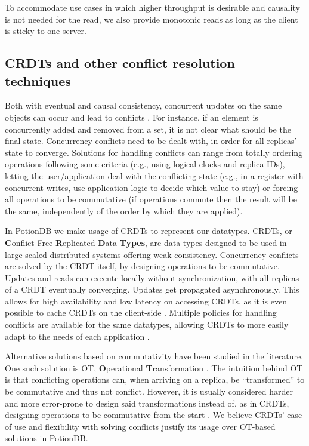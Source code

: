 To accommodate use cases in which higher throughput is desirable and causality is not needed for the read, we also provide monotonic reads as long as the client is sticky to one server.

\subsection{CRDTs and other conflict resolution techniques}

Both with eventual and causal consistency, concurrent updates on the same objects can occur and lead to conflicts \cite{understandingEC}.
For instance, if an element is concurrently added and removed from a set, it is not clear what should be the final state.
Concurrency conflicts need to be dealt with, in order for all replicas' state to converge.
Solutions for handling conflicts can range from totally ordering operations following some criteria (e.g., using logical clocks and replica IDs), letting the user/application deal with the conflicting state (e.g., in a register with concurrent writes, use application logic to decide which value to stay) or forcing all operations to be commutative (if operations commute then the result will be the same, independently of the order by which they are applied).

In PotionDB we make usage of CRDTs \cite{crdt} to represent our datatypes.
CRDTs, or \textbf{C}onflict-Free  \textbf{R}eplicated \textbf{D}ata \textbf{Types}, are data types designed to be used in large-scaled distributed systems offering weak consistency.
Concurrency conflicts are solved by the CRDT itself, by designing operations to be commutative.
Updates and reads can execute locally without synchronization, with all replicas of a CRDT eventually converging.
Updates get propagated asynchronously.
This allows for high availability and low latency on accessing CRDTs, as it is even possible to cache CRDTs on the client-side \cite{legion, swiftcloud, castineira2015collaborative}.
Multiple policies for handling conflicts are available for the same datatypes, allowing CRDTs to more easily adapt to the needs of each application \cite{crdtMultipolicy, crdt}.

Alternative solutions based on commutativity have been studied in the literature. 
One such solution is OT, \textbf{O}perational \textbf{T}ransformation \cite{ot, otCorrectness}.
The intuition behind OT is that conflicting operations can, when arriving on a replica, be ``transformed'' to be commutative and thus not conflict.
However, it is usually considered harder and more error-prone to design said transformations instead of, as in CRDTs, designing operations to be commutative from the start \cite{otCorrectness, crdt}.
We believe CRDTs' ease of use and flexibility with solving conflicts justify its usage over OT-based solutions in PotionDB.

